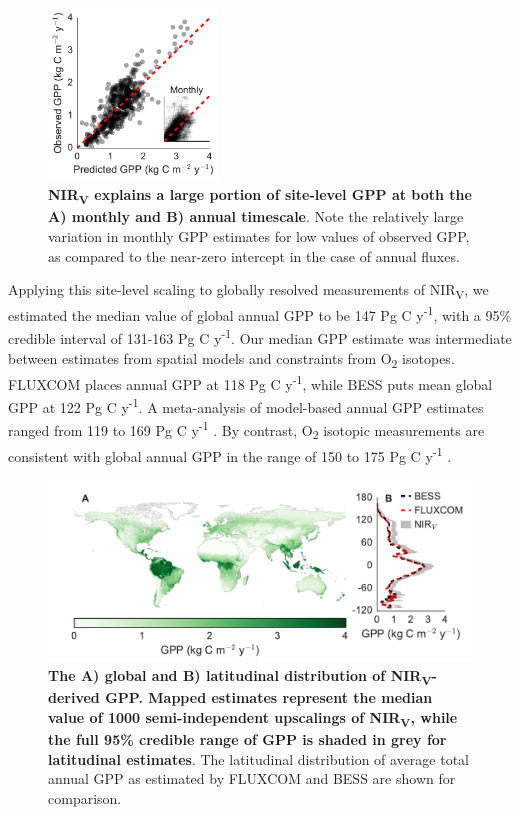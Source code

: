 \documentclass[10pt,letterpaper]{article}
\begin{document}
\begin{figure}[h]
    \centering
    \includegraphics[width=0.4\textwidth, keepaspectratio]{figure_validation_inset.pdf}
    \caption{\textbf{NIR\textsubscript{V} explains a large portion of site-level GPP at both the A) monthly and B) annual timescale}. Note the relatively large variation in monthly GPP estimates for low values of observed GPP, as compared to the near-zero intercept in the case of annual fluxes.}
    \label{fig:site_validation}
\end{figure}

Applying this site-level scaling to globally resolved measurements of NIR\textsubscript{V}, we estimated the median value of global annual GPP to be 147 Pg C y\textsuperscript{-1}, with a 95\% credible interval of 131-163 Pg C y\textsuperscript{-1}. Our median GPP estimate was intermediate between estimates from spatial models and constraints from O\textsubscript{2} isotopes. FLUXCOM places annual GPP at 118 Pg C y\textsuperscript{-1}, while BESS puts mean global GPP at 122 Pg C y\textsuperscript{-1}.  A meta-analysis of model-based annual GPP estimates ranged from 119 to 169 Pg C y\textsuperscript{-1} \cite{Anav2015}. By contrast, O\textsubscript{2} isotopic measurements are consistent with global annual GPP in the range of 150 to 175 Pg C y\textsuperscript{-1} \cite{Welp2011}. 

\begin{figure}[t]
    \centering
    \includegraphics[width=\textwidth, keepaspectratio]{figure_nirv_gpp_map_area.pdf}
    \caption{\textbf{The A) global and B) latitudinal distribution of NIR\textsubscript{V}-derived GPP.  Mapped estimates represent the median value of 1000 semi-independent upscalings of NIR\textsubscript{V}, while the full 95\% credible range of GPP is shaded in grey for latitudinal estimates}. The latitudinal distribution of average total annual GPP as estimated by FLUXCOM and BESS are shown for comparison. }
    \label{fig:gpp_map}
\end{figure}
\end{document}

